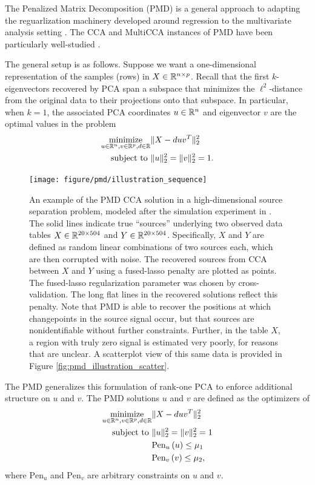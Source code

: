 \documentclass[14pt]{extarticle}
\begin{document}
The Penalized Matrix Decomposition (PMD) is a general approach to adapting the
reguarlization machinery developed around regression to the multivariate
analysis setting \citep{witten2009penalized}. The CCA and MultiCCA instances of
PMD have been particularly well-studied \citep{witten2009penalized,
  witten2013package}.

The general setup is as follows. Suppose we want a one-dimensional
representation of the samples (rows) in $X \in \mathbb{R}^{n \times p}$. Recall that
the first $k$-eigenvectors recovered by PCA span a subspace that minimizes the
$\ell^{2}$-distance from the original data to their projections onto that
subspace. In particular, when $k = 1$, the associated PCA coordinates $u \in
\mathbb{R}^{n}$ and eigenvector $v$ are the optimal values in the problem
\begin{align*}
  \mathop\mathrm{minimize}_{u \in \mathbb{R}^{n}, v \in \mathbb{R}^{p}, d \in \mathbb{R}} &\|X - duv^{T}\|_{2}^{2} \\
  \text{subject to } &\|u\|_{2}^{2} = \|v\|_{2}^{2} = 1.
\end{align*}

\begin{figure}
  \centering
  \texttt{[image: figure/pmd/illustration\_sequence]}
  \caption{An example of the PMD CCA solution in a high-dimensional source
    separation problem, modeled after the simulation experiment in
    \citep{witten2009penalized}. The solid lines indicate true ``sources''
    underlying two observed data tables $X \in \mathbb{R}^{20 \times 504}$ and $Y
    \in \mathbb{R}^{20 \times 504}$. Specifically, $X$ and $Y$ are defined as random
    linear combinations of two sources each, which are then corrupted with
    noise. The recovered sources from CCA between $X$ and $Y$ using a
    fused-lasso penalty are plotted as points. The fused-lasso regularization
    parameter was chosen by cross-validation. The long flat lines in the
    recovered solutions reflect this penalty. Note that PMD is able to recover
    the positions at which changepoints in the source signal occur, but that
    sources are nonidentifiable without further constraints. Further, in the
    table $X$, a region with truly zero signal is estimated very poorly, for
    reasons that are unclear. A scatterplot view of this same data is provided
    in Figure
    \ref{fig:pmd_illustration_scatter}. \label{fig:pmd_illustration_sequence}}
\end{figure}

The PMD generalizes this formulation of rank-one PCA to enforce additional
structure on $u$ and $v$. The PMD solutions $u$ and $v$ are defined as the
optimizers of
\begin{align}
\label{eq:pmd_opt} \mathop\mathrm{minimize}_{u \in \mathbb{R}^{n}, v \in \mathbb{R}^{p}, d
  \in \mathbb{R}} &\|X - duv^{T}\|_{2}^{2} \\
  \text{subject to } &\|u\|_{2}^{2} = \|v\|_{2}^{2} = 1 \nonumber \\
  & \text{Pen}_{u}\left(u\right) \leq \mu_{1} \nonumber \\
  & \text{Pen}_{v}\left(v\right) \leq \mu_{2}, \nonumber
\end{align}
where $\text{Pen}_u$ and $\text{Pen}_v$ are arbitrary constraints on $u$ and
$v$.
\end{document}
